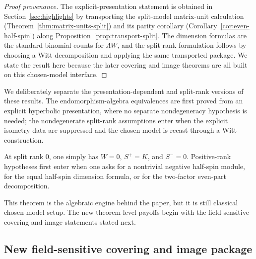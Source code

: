\documentclass{birkjour}
\theoremstyle{plain}
\theoremstyle{definition}
\theoremstyle{remark}
\newcommand{\wedgeW}{\Lambda W}
\begin{document}
\begin{proof}[Proof provenance]
The explicit-presentation statement is obtained in
Section~{}\ref{sec:highlights} by transporting the split-model matrix-unit
calculation (Theorem~{}\ref{thm:matrix-units-split}) and its parity corollary
(Corollary~{}\ref{cor:even-half-spin}) along
Proposition~{}\ref{prop:transport-split}. The dimension formulas are the standard
binomial counts for $\wedgeW$, and the split-rank formulation follows by
choosing a Witt decomposition and applying the same transported package. We
state the result here because the later covering and image theorems are all
built on this chosen-model interface.
\end{proof}

We deliberately separate the presentation-dependent and split-rank
versions of these results. The endomorphism-algebra equivalences are
first proved from an explicit hyperbolic presentation, where no separate
nondegeneracy hypothesis is needed; the nondegenerate split-rank assumptions
enter when the explicit isometry data are suppressed and the chosen model is
recast through a Witt construction.

At split rank $0$, one simply has $W=0$, $S^+=K$, and $S^-=0$. Positive-rank
hypotheses first enter when one asks for a nontrivial negative half-spin module,
for the equal half-spin dimension formula, or for the two-factor even-part
decomposition.

This theorem is the algebraic engine behind the paper, but it is still
classical chosen-model setup. The new theorem-level payoffs begin with the
field-sensitive covering and image statements stated next.

\subsection*{New field-sensitive covering and image package}
\end{document}
